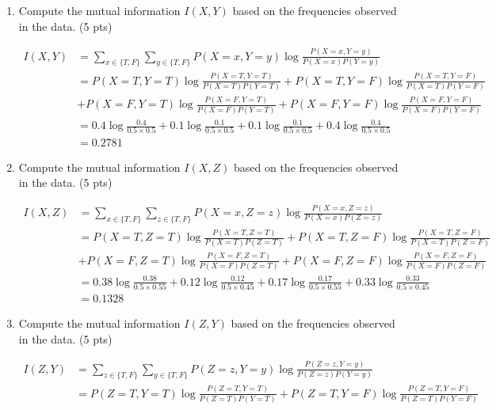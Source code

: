 \documentclass[a4paper]{article}
\theoremstyle{definition}
\newenvironment{soln}{
	\leavevmode\color{blue}\ignorespaces
}{}
\begin{document}
\begin{enumerate}
	\item Compute the mutual information $I(X, Y)$ based on the frequencies observed in the data. (5 pts)
	
	\begin{soln}
		\begin{align*}
			I(X, Y) &= \sum_{x \in \{T, F\}} \sum_{y \in \{T, F\}} P(X=x, Y=y) \log \frac{P(X=x, Y=y)}{P(X=x)P(Y=y)} \\
			&= P(X=T, Y=T) \log \frac{P(X=T, Y=T)}{P(X=T)P(Y=T)} + P(X=T, Y=F) \log \frac{P(X=T, Y=F)}{P(X=T)P(Y=F)} \\
			&+ P(X=F, Y=T) \log \frac{P(X=F, Y=T)}{P(X=F)P(Y=T)} + P(X=F, Y=F) \log \frac{P(X=F, Y=F)}{P(X=F)P(Y=F)} \\
			&= 0.4 \log \frac{0.4}{0.5 \times 0.5} + 0.1 \log \frac{0.1}{0.5 \times 0.5} + 0.1 \log \frac{0.1}{0.5 \times 0.5} + 0.4 \log \frac{0.4}{0.5 \times 0.5} \\
			&= 0.2781
		\end{align*}
	\end{soln}
	\item Compute the mutual information $I(X, Z)$ based on the frequencies observed in the data. (5 pts)
		\begin{soln}
			\begin{align*}
				I(X, Z) &= \sum_{x \in \{T, F\}} \sum_{z \in \{T, F\}} P(X=x, Z=z) \log \frac{P(X=x, Z=z)}{P(X=x)P(Z=z)} \\
				&= P(X=T, Z=T) \log \frac{P(X=T, Z=T)}{P(X=T)P(Z=T)} + P(X=T, Z=F) \log \frac{P(X=T, Z=F)}{P(X=T)P(Z=F)} \\
				&+ P(X=F, Z=T) \log \frac{P(X=F, Z=T)}{P(X=F)P(Z=T)} + P(X=F, Z=F) \log \frac{P(X=F, Z=F)}{P(X=F)P(Z=F)} \\
				&= 0.38 \log \frac{0.38}{0.5 \times 0.55} + 0.12 \log \frac{0.12}{0.5 \times 0.45} + 0.17 \log \frac{0.17}{0.5 \times 0.55} + 0.33 \log \frac{0.33}{0.5 \times 0.45} \\
				&= 0.1328
			\end{align*}
		\end{soln}
	\item Compute the mutual information $I(Z, Y)$ based on the frequencies observed in the data. (5 pts)
		\begin{soln}
			\begin{align*}
				I(Z, Y) &= \sum_{z \in \{T, F\}} \sum_{y \in \{T, F\}} P(Z=z, Y=y) \log \frac{P(Z=z, Y=y)}{P(Z=z)P(Y=y)} \\
				&= P(Z=T, Y=T) \log \frac{P(Z=T, Y=T)}{P(Z=T)P(Y=T)} + P(Z=T, Y=F) \log \frac{P(Z=T, Y=F)}{P(Z=T)P(Y=F)} \\

\end{align*}
\end{soln}
\end{enumerate}
\end{document}
